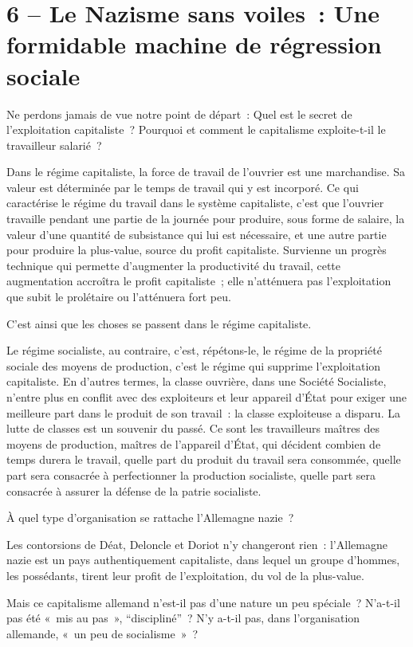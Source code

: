 \documentclass[french,twoside]{book} %
\begin{document}
\section[6 – Le Nazisme sans voiles : Une formidable machine de régression sociale]{6 – Le Nazisme sans voiles : Une formidable machine de régression sociale}
\noindent Ne perdons jamais de vue notre point de départ : Quel est le secret de l’exploitation capitaliste ? Pourquoi et comment le capitalisme exploite-t-il le travailleur salarié ?\par
Dans le régime capitaliste, la force de travail de l’ouvrier est une marchandise. Sa valeur est déterminée par le temps de travail qui y est incorporé. Ce qui caractérise le régime du travail dans le système capitaliste, c’est que l’ouvrier travaille pendant une partie de la journée pour produire, sous forme de salaire, la valeur d’une quantité de subsistance qui lui est nécessaire, et une autre partie pour produire la plus-value, source du profit capitaliste. Survienne un progrès technique qui permette d’augmenter la productivité du travail, cette augmentation accroîtra le profit capitaliste ; elle n’atténuera pas l’exploitation que subit le prolétaire ou l’atténuera fort peu.\par
C’est ainsi que les choses se passent dans le régime capitaliste.\par
Le régime socialiste, au contraire, c’est, répétons-le, le régime de la propriété sociale des moyens de production, c’est le régime qui supprime l’exploitation capitaliste. En d’autres termes, la classe ouvrière, dans une Société Socialiste, n’entre plus en conflit avec des exploiteurs et leur appareil d’État pour exiger une meilleure part dans le produit de son travail : la classe exploiteuse a disparu. La lutte de classes est un souvenir du passé. Ce sont les travailleurs maîtres des moyens de production, maîtres de l’appareil d’État, qui décident combien de temps durera le travail, quelle part du produit du travail sera consommée, quelle part sera consacrée à perfectionner la production socialiste, quelle part sera consacrée à assurer la défense de la patrie socialiste.\par
À quel type d’organisation se rattache l’Allemagne nazie ?\par
Les contorsions de Déat, Deloncle et Doriot n’y changeront rien : l’Allemagne nazie est un pays authentiquement capitaliste, dans lequel un groupe d’hommes, les possédants, tirent leur profit de l’exploitation, du vol de la plus-value.\par
Mais ce capitalisme allemand n’est-il pas d’une nature un peu spéciale ? N’a-t-il pas été « mis au pas », “discipliné” ? N’y a-t-il pas, dans l’organisation allemande, « un peu de socialisme » ?\par
\end{document}
